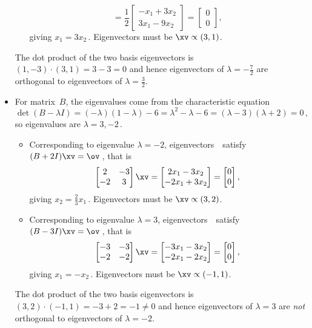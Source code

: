 \begin{example}
\begin{solution}
\begin{itemize}
\begin{itemize}
\begin{equation*}
=\frac12\begin{bmatrix} -x_1+3x_2\\3x_1-9x_2 \end{bmatrix}
=\begin{bmatrix} 0\\0 \end{bmatrix},
\end{equation*}
giving \(x_1=3x_2\)\,.  
Eigenvectors must be \(\xv\propto(3,1)\).
\end{itemize}
The dot product of the two basis eigenvectors is \((1,-3)\cdot(3,1)=3-3=0\) and hence eigenvectors of \(\lambda=-\frac72\) are orthogonal to eigenvectors of \(\lambda=\frac32\).

\item For matrix~\(B\), the eigenvalues come from the characteristic equation
\begin{equation*}
\det(B-\lambda I)
=(-\lambda)(1-\lambda)-6
=\lambda^2-\lambda-6
=(\lambda-3)(\lambda+2)=0\,,
\end{equation*}
so eigenvalues are \(\lambda=3,-2\)\,.
\begin{itemize}
\item Corresponding to eigenvalue \(\lambda=-2\), eigenvectors~\xv\ satisfy \((B+2I)\xv=\ov\)\,, that is
\begin{equation*}
\begin{bmatrix} 2&-3\\-2&3 \end{bmatrix}\xv
=\begin{bmatrix} 2x_1-3x_2\\-2x_1+3x_2 \end{bmatrix}
=\begin{bmatrix} 0\\0 \end{bmatrix},
\end{equation*}
giving \(x_2=\tfrac23x_1\)\,.  
Eigenvectors must be \(\xv\propto(3,2)\).
\item Corresponding to eigenvalue \(\lambda=3\), eigenvectors~\xv\ satisfy \((B-3I)\xv=\ov\)\,, that is
\begin{equation*}
\begin{bmatrix} -3&-3\\-2&-2 \end{bmatrix}\xv
=\begin{bmatrix} -3x_1-3x_2\\-2x_1-2x_2 \end{bmatrix}
=\begin{bmatrix} 0\\0 \end{bmatrix},
\end{equation*}
giving \(x_1=-x_2\)\,.  Eigenvectors must be \(\xv\propto(-1,1)\).
\end{itemize}
The dot product of the two basis eigenvectors is \((3,2)\cdot(-1,1)=-3+2=-1\neq 0\) and hence eigenvectors of \(\lambda=3\) are \emph{not} orthogonal to eigenvectors of \(\lambda=-2\).

\end{itemize}
\end{solution}
\end{example}
